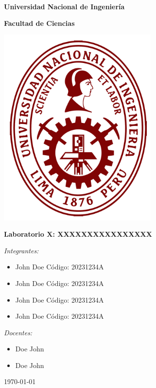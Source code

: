 \documentclass[../main.tex]{subfiles}
\begin{document}
\onecolumn

\begin{center}
\textbf{\fontsize{14}{\baselineskip}\selectfont Universidad Nacional de Ingeniería}

\bigskip

\textbf{\fontsize{14}{\baselineskip}\selectfont Facultad de Ciencias}

\bigskip

\includegraphics[width=8cm]{images/uni_logo.png}

\bigskip

\textbf{\fontsize{20}{\baselineskip}\selectfont Laboratorio X: XXXXXXXXXXXXXXXX}

\bigskip

\textit{\fontsize{14}{\baselineskip}\selectfont Integrantes:}

\begin{itemize}{}
    \item \fontsize{14}{\baselineskip}\selectfont John Doe Código: 20231234A
    \item \fontsize{14}{\baselineskip}\selectfont John Doe Código: 20231234A
    \item \fontsize{14}{\baselineskip}\selectfont John Doe Código: 20231234A
    \item \fontsize{14}{\baselineskip}\selectfont John Doe Código: 20231234A
\end{itemize}

\textit{\fontsize{14}{\baselineskip}\selectfont Docentes:}

\begin{itemize}
    \item \fontsize{14}{\baselineskip}\selectfont Doe John
    \item \fontsize{14}{\baselineskip}\selectfont Doe John
\end{itemize}

\bigskip

{\today}
\end{center}

\clearpage
\end{document}
